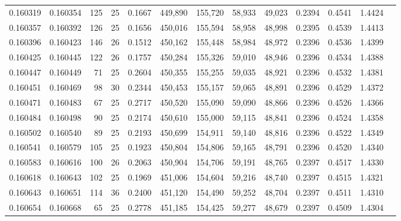 \begin{tabular}{rrrrrrrrrrrrr}
0.160319 & 0.160354 &   125 &  25 &                                     0.1667 & 449,890 & 155,720 &  58,933 &  49,023 & 0.2394 & 0.4541 & 1.4424 \\
0.160357 & 0.160392 &   126 &  25 &                                     0.1656 & 450,016 & 155,594 &  58,958 &  48,998 & 0.2395 & 0.4539 & 1.4413 \\
0.160396 & 0.160423 &   146 &  26 &                                     0.1512 & 450,162 & 155,448 &  58,984 &  48,972 & 0.2396 & 0.4536 & 1.4399 \\
0.160425 & 0.160445 &   122 &  26 &                                     0.1757 & 450,284 & 155,326 &  59,010 &  48,946 & 0.2396 & 0.4534 & 1.4388 \\
0.160447 & 0.160449 &    71 &  25 &                                     0.2604 & 450,355 & 155,255 &  59,035 &  48,921 & 0.2396 & 0.4532 & 1.4381 \\
0.160451 & 0.160469 &    98 &  30 &                                     0.2344 & 450,453 & 155,157 &  59,065 &  48,891 & 0.2396 & 0.4529 & 1.4372 \\
0.160471 & 0.160483 &    67 &  25 &                                     0.2717 & 450,520 & 155,090 &  59,090 &  48,866 & 0.2396 & 0.4526 & 1.4366 \\
0.160484 & 0.160498 &    90 &  25 &                                     0.2174 & 450,610 & 155,000 &  59,115 &  48,841 & 0.2396 & 0.4524 & 1.4358 \\
0.160502 & 0.160540 &    89 &  25 &                                     0.2193 & 450,699 & 154,911 &  59,140 &  48,816 & 0.2396 & 0.4522 & 1.4349 \\
0.160541 & 0.160579 &   105 &  25 &                                     0.1923 & 450,804 & 154,806 &  59,165 &  48,791 & 0.2396 & 0.4520 & 1.4340 \\
0.160583 & 0.160616 &   100 &  26 &                                     0.2063 & 450,904 & 154,706 &  59,191 &  48,765 & 0.2397 & 0.4517 & 1.4330 \\
0.160618 & 0.160643 &   102 &  25 &                                     0.1969 & 451,006 & 154,604 &  59,216 &  48,740 & 0.2397 & 0.4515 & 1.4321 \\
0.160643 & 0.160651 &   114 &  36 &                                     0.2400 & 451,120 & 154,490 &  59,252 &  48,704 & 0.2397 & 0.4511 & 1.4310 \\
0.160654 & 0.160668 &    65 &  25 &                                     0.2778 & 451,185 & 154,425 &  59,277 &  48,679 & 0.2397 & 0.4509 & 1.4304 \\

\end{tabular}
